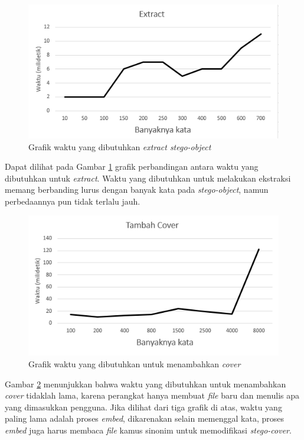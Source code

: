 \begin{figure}[H]
	\centering
	\includegraphics[scale=0.8]{Gambar/graf-extract}
	\caption{Grafik waktu yang dibutuhkan \textit{extract stego-object}} 
	\label{fig:graf-extract}
\end{figure}

Dapat dilihat pada Gambar \ref{fig:graf-extract} grafik perbandingan antara waktu yang dibutuhkan untuk \textit{extract}. Waktu yang dibutuhkan untuk melakukan ekstraksi memang berbanding lurus dengan banyak kata pada \textit{stego-object}, namun perbedaannya pun tidak terlalu jauh.

\begin{figure}[H]
	\centering
	\includegraphics[scale=0.8]{Gambar/graf-tambah-cover}
	\caption{Grafik waktu yang dibutuhkan untuk menambahkan \textit{cover}} 
	\label{fig:graf-tambah-cover}
\end{figure}

Gambar \ref{fig:graf-tambah-cover} menunjukkan bahwa waktu yang dibutuhkan untuk menambahkan \textit{cover} tidaklah lama, karena perangkat hanya membuat \textit{file} baru dan menulis apa yang dimasukkan pengguna. Jika dilihat dari tiga grafik di atas, waktu yang paling lama adalah proses \textit{embed}, dikarenakan selain memenggal kata, proses \textit{embed} juga harus membaca \textit{file} kamus sinonim untuk memodifikasi \textit{stego-cover}.